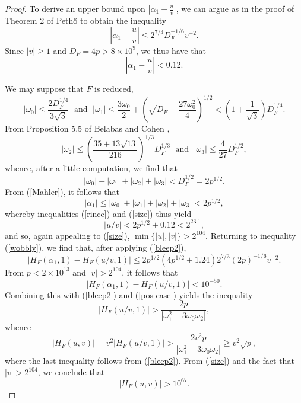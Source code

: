 \begin{proof}
To derive an upper bound upon $\left| \alpha_1 - \frac{u}{v} \right|$, we can argue as in the proof of Theorem 2 of Peth\H{o} \cite{Pet2} to obtain the inequality
\begin{equation} \label{tombstone}
\left| \alpha_1 - \frac{u}{v} \right| \leq 2^{7/3} D_F^{-1/6} v^{-2}.
\end{equation}
Since $|v| \geq 1$ and $D_F =4p > 8 \times 10^9$, we thus have that 
\begin{equation} \label{rince}
\left| \alpha_1 - \frac{u}{v} \right| < 0.12.
\end{equation}

We may suppose that $F$ is reduced,
$$
|\omega_0| \leq \frac{2D_F^{1/4}}{3 \sqrt{3}} \; \mbox{ and } \; |\omega_1| \leq  \frac{3\omega_0}{2}+  \left( \sqrt{D_F}-\frac{27\omega_0^2}{4} \right)^{1/2}
< \left( 1 + \frac{1}{\sqrt{3}} \right) D_F^{1/4}.
$$
From Proposition 5.5 of Belabas and Cohen \cite{BeCo}, 
$$
|\omega_2| \leq \left( \frac{35 + 13 \sqrt{13}}{216} \right)^{1/3} D_F^{1/3} \; \mbox{ and } \;
|\omega_3| \leq \frac{4}{27} D_F^{1/2},
$$
whence, after a little computation, we find that
$$
|\omega_0|+|\omega_1|+|\omega_2|+|\omega_3| < D_F^{1/2} = 2 p^{1/2}.
$$
From (\ref{Mahler}), it follows that
$$
|\alpha_1| \leq |\omega_0|+|\omega_1|+|\omega_2|+|\omega_3| < 2 p^{1/2},
$$
whereby inequalities (\ref{rince}) and (\ref{size}) thus yield 
$$
|u/v| < 2 p^{1/2} + 0.12 < 2^{23.1},
$$
and so, again appealing to (\ref{size}), $\min \{ |u|, |v| \} > 2^{104}$. Returning to inequality (\ref{wobbly}), we find that, after applying (\ref{bleep2}),
$$
\left| H_F (\alpha_1,1) - H_F (u/v,1) \right| \leq 2 p^{1/2}  \left( 4 p^{1/2} + 1.24 \right) 2^{7/3} (2 p)^{-1/6} v^{-2}.
$$
From $p < 2 \times 10^{13}$ and $|v| > 2^{104}$, it follows that
$$
\left| H_F (\alpha_1,1) - H_F (u/v,1) \right| < 10^{-50}.
$$
Combining this with (\ref{bleep2}) and (\ref{pos-case}) yields the inequality
$$
\left| H_F(u/v,1) \right| >  \frac{2 p}{|\omega_1^2-3\omega_0 \omega_2|},
$$
whence
$$
 |H_F(u,v)| = v^2 \left| H_F(u/v,1) \right| > \frac{2 v^2 p}{|\omega_1^2-3\omega_0 \omega_2|} \geq v^2 \sqrt{p},
$$
where the last inequality follows from  (\ref{bleep2}).
From  (\ref{size}) and the fact that $|v| > 2^{104}$, we conclude that
$$
 |H_F(u,v)|> 10^{67}.
$$


\end{proof}

